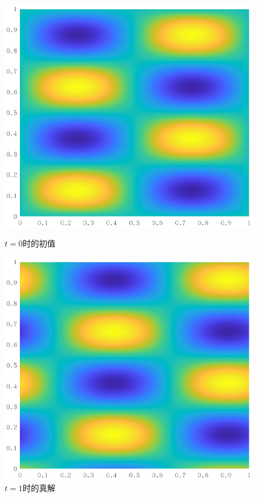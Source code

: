 \documentclass[lang=cn,10pt,bibend=bibtex]{elegantbook}
\begin{document}
\begin{figure}[H]
  \centering
  \begin{minipage}[t]{0.49\linewidth}
      \centering
      \includegraphics[width=0.9\linewidth]{figure/test1_init.eps}
      \caption*{$t=0$时的初值}
  \end{minipage}
  \begin{minipage}[t]{0.49\linewidth}
    \centering
    \includegraphics[width=0.9\linewidth]{figure/test1_end.eps}
    \caption*{$t=1$时的真解}
  \end{minipage}
\end{figure}
\end{document}
